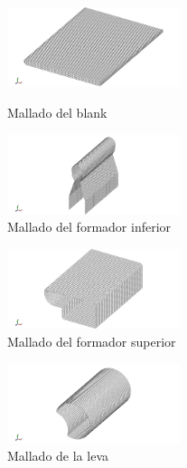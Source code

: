 \begin{figure}[H]
\centering
\includegraphics[width=0.45\textwidth]{src/ch3/mesh_blank.png}
\label{fig:mesh_blank}
\caption{Mallado del blank}
\end{figure}


\begin{figure}[H]
\centering
\includegraphics[width=0.45\textwidth]{src/ch3/mesh_fi.png}
\caption{Mallado del formador inferior}
\label{fig:mesh_fi}
\end{figure}

\begin{figure}[H]
\centering
\includegraphics[width=0.45\textwidth]{src/ch3/mesh_fs.png}
\caption{Mallado del formador superior}
\label{fig:mesh_fi}
\end{figure}

\begin{figure}[H]
\centering
\includegraphics[width=0.45\textwidth]{src/ch3/mesh_leva.png}
\caption{Mallado de la leva}
\label{fig:mesh_fi}
\end{figure}



